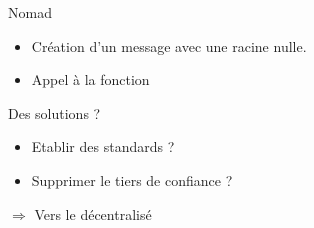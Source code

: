 \begin{frame}{Nomad}
    \begin{itemize}
        \item Création d'un message avec une racine nulle.
        \item Appel à la fonction 
    \end{itemize}
\end{frame}

\begin{frame}{Des solutions ?}
    \begin{itemize}
        \item Etablir des standards ?
        \item Supprimer le tiers de confiance ?
    \end{itemize}
    $\Rightarrow$ Vers le décentralisé
\end{frame}
